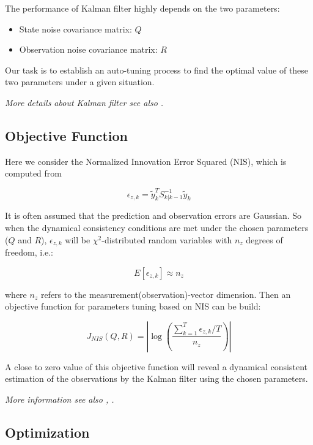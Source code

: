 The performance of Kalman filter highly depends on the two parameters: 
\begin{itemize}
    \item State noise covariance matrix: $Q$ 
    \item Observation noise covariance matrix: $R$
\end{itemize}

Our task is to establish an auto-tuning process to find the optimal value of these two parameters under a given situation.

\textit{More details about Kalman filter see also \citep{faragher2012understanding}.}
\subsection{Objective Function}

Here we consider the Normalized Innovation Error Squared (NIS), which is computed from 

\begin{equation*}
    \epsilon_{z, k} = \tilde{y}_k^T S_{k|k-1}^{-1}\tilde{y}_k
\end{equation*}

It is often assumed that the prediction and observation errors are Gaussian. 
So when the dynamical consistency conditions are met under the chosen parameters ($Q$ and $R$), $\epsilon_{z, k}$ will be $\chi ^2$-distributed random variables with $n_z$ degrees of freedom, i.e.:

\begin{equation*}
    E[\epsilon_{z, k}] \approx n_z
\end{equation*}

where $n_z$ refers to the measurement(observation)-vector dimension.
Then an objective function for parameters tuning based on NIS can be build:

\begin{equation*}
    J_{NIS}(Q, R) = \left\lvert \log \left(\frac{\sum_{k=1}^T \epsilon_{z, k} / T}{n_z}\right)\right\rvert 
\end{equation*}

A close to zero value of this objective function will reveal a dynamical consistent estimation of the observations by the Kalman filter using the chosen parameters.

\textit{More information see also \citep{chen2018weak}, \citep{chen2019kalman}.}

\subsection{Optimization}

